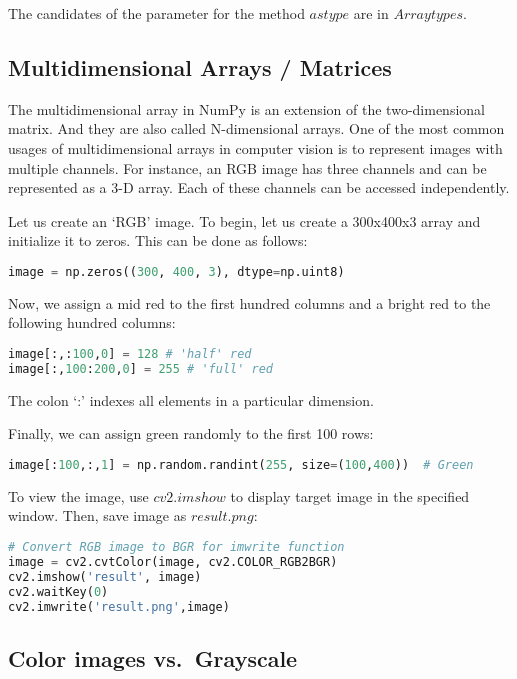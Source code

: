 \documentclass[11pt]{article}
\begin{document}
The candidates of the parameter for the method {$astype$} are in \href{https://numpy.org/doc/stable/user/basics.types.html}{$Array types$}.

\subsection{Multidimensional Arrays / Matrices}
The multidimensional array in NumPy is an extension of the two-dimensional matrix. And they are also called N-dimensional arrays. One of the most common usages of multidimensional arrays in computer vision is to represent images with multiple channels. For instance, an RGB image has three channels and can be represented as a 3-D array. Each of these channels can be accessed independently.

Let us create an `RGB' image. To begin, let us create a 300x400x3 array and initialize it to zeros. This can be done as follows:
\begin{lstlisting}[language=python]
image = np.zeros((300, 400, 3), dtype=np.uint8)
\end{lstlisting}

Now, we assign a mid red to the first hundred columns and a bright red to the following hundred columns:
\begin{lstlisting}[language=python]
image[:,:100,0] = 128 # 'half' red
image[:,100:200,0] = 255 # 'full' red
\end{lstlisting}

The colon `:' indexes all elements in a particular dimension.

Finally, we can assign green randomly to the first 100 rows:
\begin{lstlisting}[language=python]
image[:100,:,1] = np.random.randint(255, size=(100,400))  # Green
\end{lstlisting}

To view the image, use {$cv2.imshow$} to display target image in the specified window. Then, save image as {$result.png$}:
\begin{lstlisting}[language=python]
# Convert RGB image to BGR for imwrite function
image = cv2.cvtColor(image, cv2.COLOR_RGB2BGR)
cv2.imshow('result', image)
cv2.waitKey(0) 
cv2.imwrite('result.png',image)
\end{lstlisting}

\subsection{Color images vs.~Grayscale}
\end{document}
